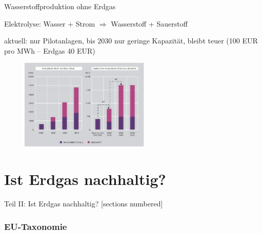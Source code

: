 \documentclass[10pt]{beamer}
\begin{document}
\begin{frame}{Wasserstoffproduktion ohne Erdgas}
  \begin{small}
  Elektrolyse: Wasser + Strom $\Rightarrow$ Wasserstoff + Sauerstoff

  aktuell: nur Pilotanlagen, bis 2030 nur geringe Kapazität, bleibt teuer (100 EUR pro MWh -- Erdgas 40 EUR)
  \end{small}


  \begin{figure}
    \includegraphics[width=0.55\textwidth]{fig/wasserstoff-strombedarf.png}

    \scriptsize{}
  \end{figure}
\end{frame}



\part{Ist Erdgas nachhaltig?}
\frame{\partpage}

\begin{frame}{Teil II: Ist Erdgas nachhaltig?}
  [sections numbered]
  \tableofcontents[hideallsubsections,part=2]
\end{frame}

\section{EU-Taxonomie}
\end{document}
